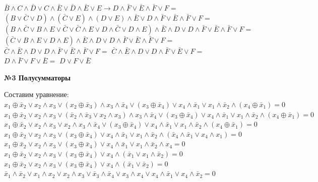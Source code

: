 \begin{enumerate}
\begin{spacing}{1.5}
            \item $\bar B \wedge C \wedge \bar D \vee C \wedge \bar E \vee \bar D \wedge \bar E \vee E \rightarrow D \wedge \bar F \vee \bar E \wedge \bar F \vee F = $\\
            $(B \vee \bar C \vee D) \wedge (\bar C \vee E) \wedge (D \vee E) \wedge \bar E \vee D \wedge \bar F \vee \bar E \wedge \bar F \vee F = $\\
            $(B \wedge \bar C \vee B \wedge E \vee \bar C \vee \bar C \wedge E \vee D \wedge \bar C \vee D \wedge E) \wedge \bar E \wedge D \vee D \wedge \bar F \vee \bar E \wedge \bar F \vee F = $
            $(\bar C \vee B \wedge E \vee D \wedge E) \wedge \bar E \wedge D \vee D \wedge \bar F \vee \bar E \wedge \bar F \vee F = $
            $\bar C \wedge \bar E \wedge D \vee D \wedge \bar F \vee \bar E \wedge \bar F \vee F = $
            $\bar C \wedge \bar E \wedge D \vee D \wedge \bar F \vee \bar E \vee F = $
            $D \wedge \bar F \vee F \vee \bar E =$
            $D \vee F \vee \bar E$


        \end{spacing}
    \end{enumerate}


    \begin{center}
        \textbf{№3 Полусумматоры}
    \end{center}

    Составим уравнение:\\
    $x_1 \oplus \bar x_2 \vee x_2 \wedge x_3 \vee (x_2 \oplus \bar x_3) \wedge x_3 \wedge \bar x_4 \vee (x_3 \oplus \bar x_4) \vee x_4 \wedge \bar x_1 \vee x_1 \wedge \bar x_2 \wedge (x_4 \oplus \bar x_1) = 0$\\
    $x_1 \oplus \bar x_2 \vee x_2 \wedge x_3 \vee (\bar x_2 \wedge \bar x_3 \vee x_2 \wedge x_3) \wedge x_3 \wedge \bar x_4 \vee (x_3 \oplus \bar x_4) \vee x_4 \wedge \bar x_1 \vee x_1 \wedge \bar x_2 \wedge (x_4 \oplus \bar x_1) = 0$\\
    $x_1 \oplus \bar x_2 \vee x_2 \wedge x_3 \vee x_2 \wedge x_3 \wedge \bar x_4 \vee (x_3 \oplus \bar x_4) \vee x_4 \wedge \bar x_1 \vee x_1 \wedge \bar x_2 \wedge (x_4 \oplus \bar x_1) = 0$\\
    $x_1 \oplus \bar x_2 \vee x_2 \wedge x_3 \vee (x_3 \oplus \bar x_4) \vee x_4 \wedge \bar x_1 \vee x_1 \wedge \bar x_2 \wedge (\bar x_4 \wedge \bar x_1 \vee x_4 \wedge x_1) = 0$\\
    $x_1 \oplus \bar x_2 \vee x_2 \wedge x_3 \vee (x_3 \oplus \bar x_4) \vee x_4 \wedge \bar x_1 \vee x_1 \wedge \bar x_2 \wedge x_4 = 0$\\
    $x_1 \oplus \bar x_2 \vee x_2 \wedge x_3 \vee (x_3 \oplus \bar x_4) \vee x_4 \wedge(\bar x_1 \vee x_1 \wedge \bar x_2) = 0$\\
    $x_1 \oplus \bar x_2 \vee x_2 \wedge x_3 \vee (x_3 \oplus \bar x_4) \vee x_4 \wedge(\bar x_1 \vee \bar x_2) = 0$\\
    $\bar x_1 \wedge \bar x_2 \vee x_1 \wedge x_2 \vee x_2 \wedge x_3 \vee \bar x_3 \wedge \bar x_4 \vee x_3 \wedge x_4 \vee x_4 \wedge \bar x_1 \vee x_4 \wedge \bar x_2 = 0$

